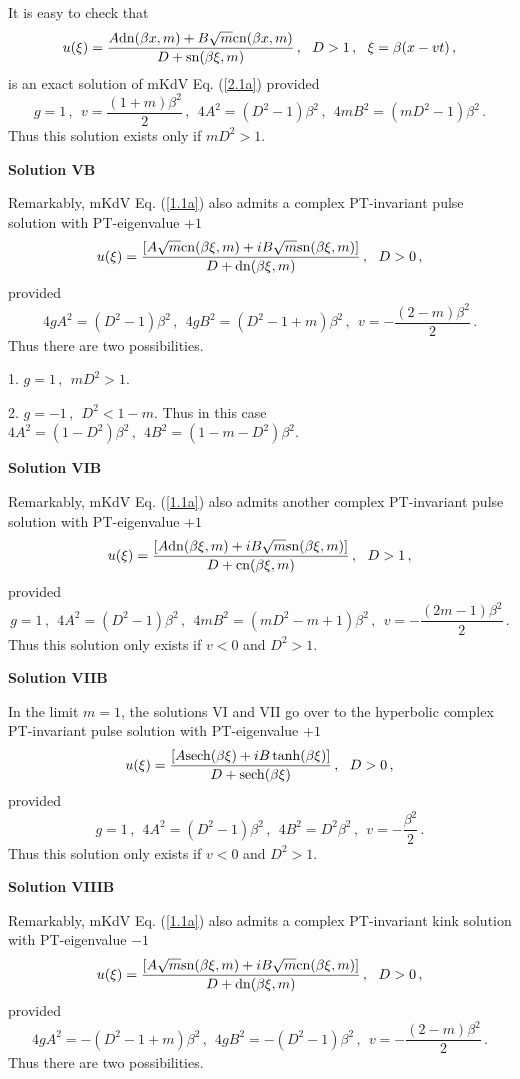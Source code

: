 \documentclass[11pt]{article}
\newcommand{\be}{\begin{equation}}
\newcommand{\ee}{\end{equation}}
\newcommand{\sn}{{\rm sn}}
\newcommand{\dn}{{\rm dn}}
\newcommand{\cn}{{\rm cn}}
\newcommand{\sech}{{\rm sech}}
\begin{document}
It is easy to check that
\be\label{B10a}
u(\xi) = \frac{A\dn(\beta x,m)+B\sqrt{m}\cn(\beta x,m)}{D+\sn(\beta \xi,m)}\,,
~~D > 1\,,~~\xi = \beta(x-vt)\,,
\ee
is an exact solution of mKdV Eq. (\ref{2.1a}) provided
\be\label{B11}
g = 1\,,~~v = \frac{(1+m)\beta^2}{2}\,,~~4A^2 = (D^2-1)\beta^2\,,~~
4m B^2 = (mD^2-1)\beta^2\,.
\ee
Thus this solution exists only if $m D^2 > 1$.

{\bf Solution VB}

Remarkably, mKdV Eq. (\ref{1.1a}) also admits a complex PT-invariant 
pulse solution with PT-eigenvalue +$1$
\be\label{B12}
u(\xi) = \frac{[A\sqrt{m}\cn(\beta \xi,m)+iB\sqrt{m} \sn(\beta \xi,m)]}
{D+\dn(\beta \xi,m)}\,,~~D > 0\,,
\ee
provided
\be\label{B13}
4g A^2 = (D^2-1)\beta^2\,,~~4g B^2 = (D^2-1+m)\beta^2\,,~~
v = -\frac{(2-m)\beta^2}{2}\,.
\ee
Thus there are two possibilities.

1. $g = 1\,,~~m D^2 > 1$. 

2. $g = -1\,,~~D^2 < 1-m$. Thus in this case $4A^2 = (1-D^2)\beta^2\,,
~~4B^2 = (1-m-D^2)\beta^2$.

{\bf Solution VIB}

Remarkably, mKdV Eq. (\ref{1.1a}) also admits another complex PT-invariant 
pulse solution with PT-eigenvalue +$1$
\be\label{B14}
u(\xi) = \frac{[A\dn(\beta \xi,m)+iB\sqrt{m} \sn(\beta \xi,m)]}
{D+\cn(\beta \xi,m)}\,,~~D > 1\,,
\ee
provided
\be\label{B15}
g=1\,,~~4 A^2 = (D^2-1)\beta^2\,,~~4m B^2 = (m D^2 -m+1) \beta^2\,,~~
v = -\frac{(2m-1)\beta^2}{2}\,.
\ee
Thus this solution only exists if $v < 0$ and $D^2 > 1$. 

{\bf Solution VIIB}

In the limit $m =1$, the solutions VI and VII go over to the hyperbolic 
complex PT-invariant pulse solution with PT-eigenvalue +$1$
\be\label{B16}
u(\xi) = \frac{[A\sech(\beta \xi)+iB \tanh(\beta \xi)]}
{D+\sech(\beta \xi)}\,,~~D > 0\,,
\ee
provided
\be\label{B17}
g=1\,,~~4 A^2 = (D^2-1)\beta^2\,,~~4 B^2 = D^2 \beta^2\,,~~
v = -\frac{\beta^2}{2}\,.
\ee
Thus this solution only exists if $v < 0$ and $D^2 > 1$. 

{\bf Solution VIIIB}

Remarkably, mKdV Eq. (\ref{1.1a}) also admits a complex PT-invariant 
kink solution with PT-eigenvalue $-1$
\be\label{B18}
u(\xi) = \frac{[A\sqrt{m} \sn(\beta \xi,m)+iB\sqrt{m} \cn(\beta \xi,m)]}
{D+\dn(\beta \xi,m)}\,,~~D > 0\,,
\ee
provided
\be\label{B19}
4g A^2 = -(D^2-1+m) \beta^2\,,~~4g B^2 = -(D^2-1)\beta^2\,,~~
v = -\frac{(2-m)\beta^2}{2}\,.
\ee
Thus there are two possibilities.
\end{document}
